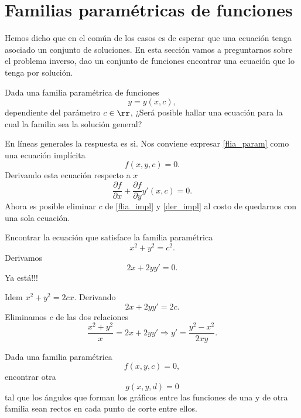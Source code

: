 \section{Familias paramétricas de funciones}

Hemos dicho que en el común de los casos es de esperar que una
ecuación tenga asociado un conjunto de soluciones. En esta sección vamos a preguntarnos sobre el problema inverso, dao un conjunto de funciones encontrar una ecuación que lo tenga por solución.



\begin{problema}
Dada una familia paramétrica de funciones
 \begin{equation}\label{flia_param}y=y(x,c),\end{equation}
 dependiente del parámetro $c\in\rr$, ¿Será posible hallar una ecuación para la cual la familia sea la solución general?
\end{problema}

En líneas generales la respuesta es si. Nos conviene expresar \eqref{flia_param} como una ecuación implícita
\begin{equation}\label{flia_impl}f(x,y,c)=0.\end{equation}
Derivando esta ecuación respecto a $x$
\begin{equation}\label{der_impl}
 \frac{\partial f}{\partial x}+\frac{\partial f}{\partial y}y'(x,c)=0.
\end{equation}
Ahora es posible eliminar $c$ de \eqref{flia_impl} y \eqref{der_impl} al costo de quedarnos con una sola ecuación.




\begin{ejemplo} Encontrar la ecuación que satisface la familia paramétrica
\[x^2+y^2=c^2.\]
Derivamos
\[2x+2yy'=0.\]
Ya está!!!
\end{ejemplo}

\begin{ejemplo} Idem $x^2+y^2=2cx$.  Derivando
\[2x+2yy'=2c.\]
Eliminamos $c$ de las dos relaciones
\[\frac{x^2+y^2}{x}=2x+2yy'\Rightarrow \boxed{y'=\frac{y^2-x^2}{2xy}}.\]
\end{ejemplo}


\begin{problema}
 Dada una familia paramétrica
 \[f(x,y,c)=0,\]
 encontrar otra
 \[g(x,y,d)=0\]
 tal que los ángulos que forman los gráficos entre las funciones de una y de otra familia sean rectos  en cada punto de corte entre ellos.
\end{problema}




